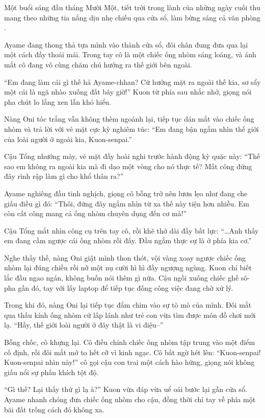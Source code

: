\documentclass[../main.tex]{subfiles}
\begin{document}
Một buổi sáng đầu tháng Mười Một, tiết trời trong lành của những ngày cuối thu mang theo những tia nắng dịu nhẹ chiếu qua cửa sổ, làm bừng sáng cả văn phòng \hll.

Ayame đang thong thả tựa mình vào thành cửa sổ, đôi chân đung đưa qua lại một cách đầy thoải mái. Trong tay cô là một chiếc ống nhòm sáng loáng, và ánh mắt cô đang vô cùng chăm chú hướng ra thế giới bên ngoài.

``Em đang làm cái gì thế hả Ayame-chhan? Cứ hướng mặt ra ngoài thế kia, sơ sẩy một cái là ngã nhào xuống đất bây giờ!'' Kuon từ phía sau nhắc nhở, giọng nói pha chút lo lắng xen lẫn khó hiểu.

Nàng Oni tóc trắng vẫn không thèm ngoảnh lại, tiếp tục dán mắt vào chiếc ống nhòm và trả lời với vẻ mặt cực kỳ nghiêm túc: ``Em đang bận ngắm nhìn thế giới của loài người ở ngoài kia, Kuon-senpai.''


Cậu Tổng nhướng mày, vẻ mặt đầy hoài nghi trước hành động kỳ quặc này: ``Thế sao em không ra ngoài kia mà đi dạo một vòng cho nó thực tế? Mất công đứng đây rình rập làm gì cho khổ thân ra?''

Ayame nghiêng đầu tinh nghịch, giọng cô bỗng trở nên lươn lẹo như đang che giấu điều gì đó: ``Thôi, đứng đây ngắm nhìn từ xa thế này tiện hơn nhiều. Em còn cất công mang cả ống nhòm chuyên dụng đến cơ mà!''

Cậu Tổng mắt nhìn công cụ trên tay cô, rồi khẽ thở dài đầy bất lực: ``\dots Anh thấy em đang cầm ngược cái ống nhòm rồi đấy. Đầu ngắm thực sự là ở phía kia cơ.''

Nghe thấy thế, nàng Oni giật mình thon thót, vội vàng xoay ngược chiếc ống nhòm lại đúng chiều rồi nở một nụ cười hì hì đầy ngượng ngùng. Kuon chỉ biết lắc đầu ngao ngán, không buồn nói thêm gì nữa. Cậu ngồi xuống chiếc ghế sô-pha gần đó, tay với lấy laptop để tiếp tục đống công việc đang chờ xử lý.

Trong khi đó, nàng Oni lại tiếp tục đắm chìm vào sự tò mò của mình. Đôi mắt qua thấu kính ống nhòm cứ lấp lánh như trẻ con vừa tìm được món đồ chơi mới lạ. ``Hầy, thế giới loài người ở đây thật là vi diệu--''

Bỗng chốc, cô khựng lại. Cô điều chỉnh chiếc ống nhòm tập trung vào một điểm cố định, rồi đôi mắt mở to hết cỡ vì kinh ngạc. Cô bất ngờ hét lên: ``Kuon-senpai! Kuon-senpai nhìn này!'' cô gọi cậu con trai một cách hào hứng, giọng nói không giấu nổi sự phấn khích tột độ.

``Gì thế? Lại thấy thứ gì lạ à?'' Kuon vừa đáp vừa uể oải bước lại gần cửa sổ. Ayame nhanh chóng đưa chiếc ống nhòm cho cậu, đồng thời chỉ tay về phía một bãi đất trống cách đó không xa.
\end{document}
